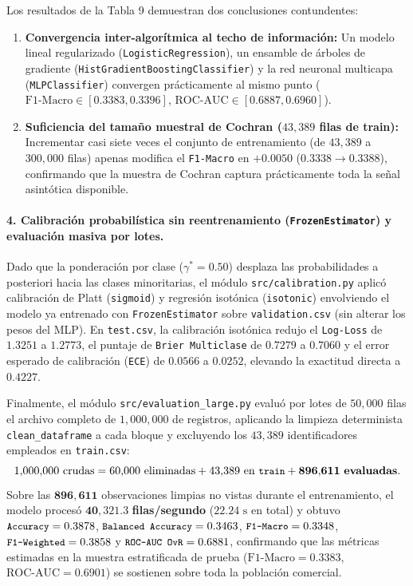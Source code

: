 \documentclass[11pt,a4paper]{article}
\newcommand{\code}[1]{\texttt{\small #1}}
\begin{document}
Los resultados de la Tabla 9 demuestran dos conclusiones contundentes:
\begin{enumerate}[noitemsep]
    \item \textbf{Convergencia inter-algorítmica al techo de información:} Un modelo lineal regularizado (\code{LogisticRegression}), un ensamble de árboles de gradiente (\code{HistGradientBoostingClassifier}) y la red neuronal multicapa (\code{MLPClassifier}) convergen prácticamente al mismo punto ($\text{F1-Macro} \in [0.3383, 0.3396]$, $\text{ROC-AUC} \in [0.6887, 0.6960]$).
    \item \textbf{Suficiencia del tamaño muestral de Cochran ($43{,}389$ filas de train):} Incrementar casi siete veces el conjunto de entrenamiento (de $43{,}389$ a $300{,}000$ filas) apenas modifica el \code{F1-Macro} en $+0.0050$ ($0.3338 \rightarrow 0.3388$), confirmando que la muestra de Cochran captura prácticamente toda la señal asintótica disponible.
\end{enumerate}

\paragraph{4. Calibración probabilística sin reentrenamiento (\code{FrozenEstimator}) y evaluación masiva por lotes.}
Dado que la ponderación por clase ($\gamma^* = 0.50$) desplaza las probabilidades a posteriori hacia las clases minoritarias, el módulo \code{src/calibration.py} aplicó calibración de Platt (\code{sigmoid}) y regresión isotónica (\code{isotonic}) envolviendo el modelo ya entrenado con \code{FrozenEstimator} sobre \code{validation.csv} (sin alterar los pesos del MLP). En \code{test.csv}, la calibración isotónica redujo el \code{Log-Loss} de $1.3251$ a $\mathbf{1.2773}$, el puntaje de \code{Brier Multiclase} de $0.7279$ a $\mathbf{0.7060}$ y el error esperado de calibración (\code{ECE}) de $0.0566$ a $\mathbf{0.0252}$, elevando la exactitud directa a $0.4227$.

Finalmente, el módulo \code{src/evaluation\_large.py} evaluó por lotes de $50{,}000$ filas el archivo completo de $1{,}000{,}000$ de registros, aplicando la limpieza determinista \code{clean\_dataframe} a cada bloque y excluyendo los $43{,}389$ identificadores empleados en \code{train.csv}:
\begin{equation}
    1{,}000{,}000\text{ crudas} = 60{,}000\text{ eliminadas} + 43{,}389\text{ en \code{train}} + \mathbf{896{,}611}\text{ \textbf{evaluadas}}.
\end{equation}
Sobre las $\mathbf{896{,}611}$ observaciones limpias no vistas durante el entrenamiento, el modelo procesó $\mathbf{40{,}321.3}$ \textbf{filas/segundo} ($22.24\text{ s}$ en total) y obtuvo $\text{\code{Accuracy}} = 0.3878$, $\text{\code{Balanced Accuracy}} = 0.3463$, $\text{\code{F1-Macro}} = 0.3348$, $\text{\code{F1-Weighted}} = 0.3858$ y $\text{\code{ROC-AUC OvR}} = 0.6881$, confirmando que las métricas estimadas en la muestra estratificada de prueba ($\text{F1-Macro} = 0.3383$, $\text{ROC-AUC} = 0.6901$) se sostienen sobre toda la población comercial.
\end{document}
